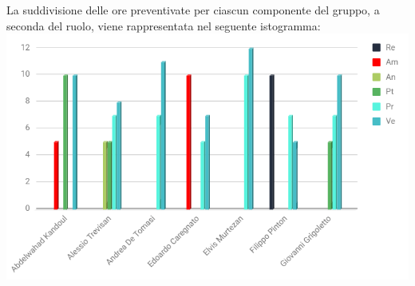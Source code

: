 La suddivisione delle ore preventivate per ciascun componente del gruppo, a seconda del ruolo, viene rappresentata nel seguente istogramma:\\
\includegraphics[width=1\textwidth]{./src/Preventivo/src/img/IstoValidazione.png}


\clearpage


